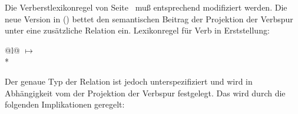 Die Verberstlexikonregel von Seite~\pageref{lr-verb-movement2} muß entsprechend modifiziert werden.
Die neue Version in () bettet den semantischen Beitrag der Projektion der Verbspur 
unter eine zusätzliche Relation ein.
\eas
\label{lr-verb-movement3}
Lexikonregel für Verb in Erststellung:\\
\begin{tabular}[t]{@{}l@{}}
 $\mapsto$\\*
\end{tabular}
\zs
Der genaue Typ der Relation ist jedoch unterspezifiziert und wird in Abhängigkeit vom
\slashw der Projektion der Verbspur festgelegt. Das wird durch die folgenden Implikationen geregelt:

